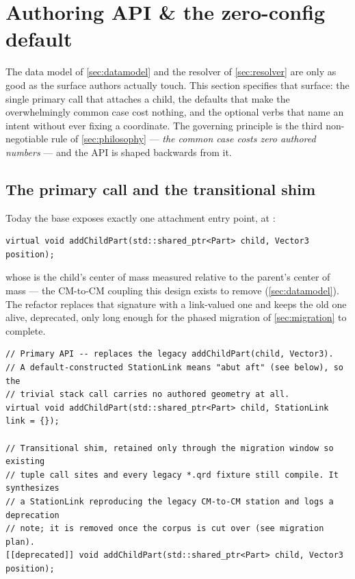\section{Authoring API \& the zero-config default}\label{sec:authoring}

The data model of \cref{sec:datamodel} and the resolver of \cref{sec:resolver} are only
as good as the surface authors actually touch. This section specifies that surface: the
single primary call that attaches a child, the defaults that make the overwhelmingly
common case cost nothing, and the optional verbs that name an intent without ever fixing
a coordinate. The governing principle is the third non-negotiable rule of
\cref{sec:philosophy} --- \emph{the common case costs zero authored numbers} --- and the
API is shaped backwards from it.

\subsection{The primary call and the transitional shim}

Today the base  exposes exactly one attachment entry point, at
:

\begin{verbatim}
virtual void addChildPart(std::shared_ptr<Part> child, Vector3 position);
\end{verbatim}

\noindent whose  is the child's center of mass measured
relative to the parent's center of mass --- the CM-to-CM coupling this design exists to
remove (\cref{sec:datamodel}). The refactor replaces that signature with a link-valued
one and keeps the old one alive, deprecated, only long enough for the phased migration of
\cref{sec:migration} to complete.

\begin{listing}[htbp]
\begin{verbatim}
// Primary API -- replaces the legacy addChildPart(child, Vector3).
// A default-constructed StationLink means "abut aft" (see below), so the
// trivial stack call carries no authored geometry at all.
virtual void addChildPart(std::shared_ptr<Part> child, StationLink link = {});

// Transitional shim, retained only through the migration window so existing
// tuple call sites and every legacy *.qrd fixture still compile. It synthesizes
// a StationLink reproducing the legacy CM-to-CM station and logs a deprecation
// note; it is removed once the corpus is cut over (see migration plan).
[[deprecated]] void addChildPart(std::shared_ptr<Part> child, Vector3 position);
\end{verbatim}
\caption{The link-valued primary  and the \code{[[deprecated]]}
 shim that bridges the migration.}\label{lst:api}
\end{listing}


